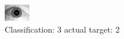 \begin{figure}[h!]
\begin{center}
\includegraphics[width=0.60\columnwidth]{figures/ID1659_class_3_target_2.png}
\end{center}
\caption{ Classification: 3 actual target: 2}
\label{fig:ID1659_class_3_target_2}
\end{figure}
